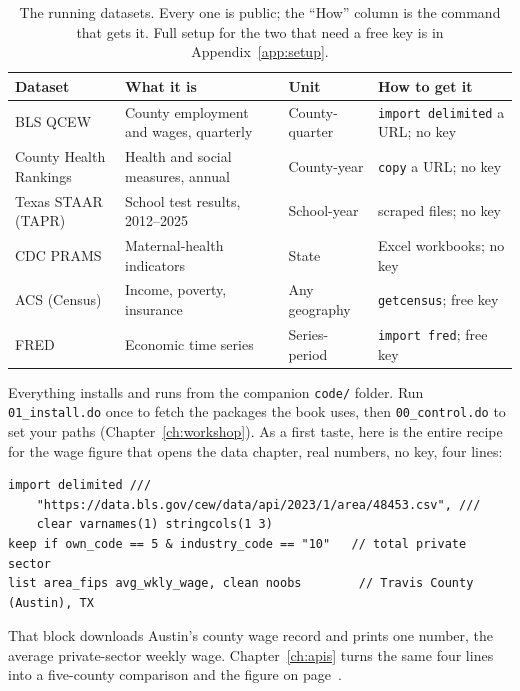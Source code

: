 \documentclass[
    a4paper,
    fontsize=10pt,
    twoside=true,
    numbers=noenddot,
]{kaobook}
\begin{document}
\begin{table}[htbp]
\centering
\footnotesize
\caption[The book's running datasets]{The running datasets. Every one is public; the ``How'' column is the command that gets it. Full setup for the two that need a free key is in Appendix~\ref{app:setup}.}
\label{tab:data}
\begin{tabular}{@{}p{2.5cm}p{3.4cm}p{2.1cm}p{3.0cm}@{}}
\hline
\textbf{Dataset} & \textbf{What it is} & \textbf{Unit} & \textbf{How to get it} \\
\hline
BLS QCEW & County employment and wages, quarterly & County-quarter & \texttt{import delimited} a URL; no key \\
County Health Rankings & Health and social measures, annual & County-year & \texttt{copy} a URL; no key \\
Texas STAAR (TAPR) & School test results, 2012--2025 & School-year & scraped files; no key \\
CDC PRAMS & Maternal-health indicators & State & Excel workbooks; no key \\
ACS (Census) & Income, poverty, insurance & Any geography & \texttt{getcensus}; free key \\
FRED & Economic time series & Series-period & \texttt{import fred}; free key \\
\hline
\end{tabular}
\end{table}

Everything installs and runs from the companion \texttt{code/} folder. Run \texttt{01\_install.do} once to fetch the packages the book uses, then \texttt{00\_control.do} to set your paths (Chapter~\ref{ch:workshop}). As a first taste, here is the entire recipe for the wage figure that opens the data chapter, real numbers, no key, four lines:
{\footnotesize
\begin{verbatim}
import delimited ///
    "https://data.bls.gov/cew/data/api/2023/1/area/48453.csv", ///
    clear varnames(1) stringcols(1 3)
keep if own_code == 5 & industry_code == "10"   // total private sector
list area_fips avg_wkly_wage, clean noobs        // Travis County (Austin), TX
\end{verbatim}
}
That block downloads Austin's county wage record and prints one number, the average private-sector weekly wage. Chapter~\ref{ch:apis} turns the same four lines into a five-county comparison and the figure on page~\pageref{fig:qcew}.
\end{document}
